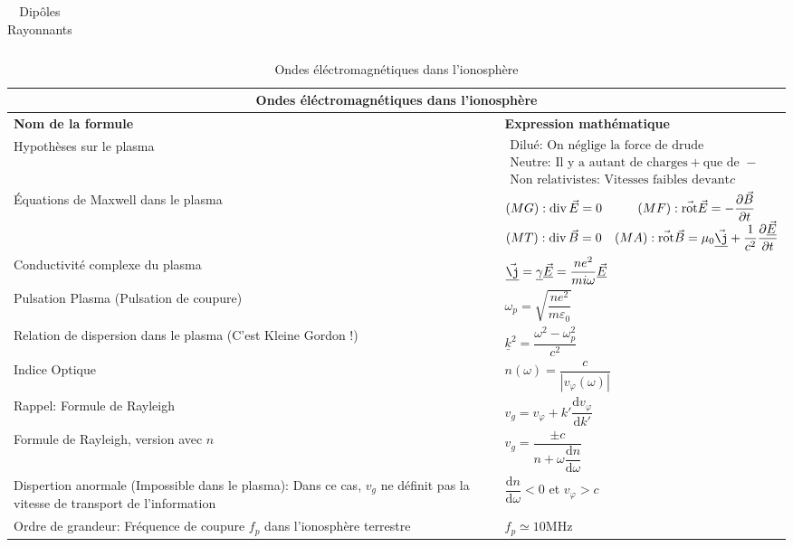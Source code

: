 \documentclass[10pt,a4paper,titlepage,portrait]{article}
\renewcommand{\d}
{
    \mathrm{d}
}
\newcommand*{\dv}[2]
{
    \dfrac{\d#1}{\d#2}
}
\newcommand*{\dpv}[2]
{
    \dfrac{\partial#1}{\partial#2}
}
\newcommand{\rot}
{
    \vec{\operatorname{rot}}
}
\renewcommand{\div}
{
    \operatorname{div}
}
\renewcommand{\arraystretch}{2}
\begin{document}
\begin{center}
\begin{table}[H]
\begin{tabular}{@{}p{9cm}p{10cm}@{}}
    \bottomrule
\end{tabular}
\caption{Dipôles Rayonnants}
\label{tab:der}
\end{table}

\begin{table}[H]
    \centering
    \renewcommand{\arraystretch}{1.5} %
    \setlength{\tabcolsep}{8pt} %
    \begin{tabular}{@{}p{9cm}p{10cm}@{}}
        \toprule
        \multicolumn{2}{c}{\textbf{Ondes éléctromagnétiques dans l'ionosphère}} \\
        \midrule
        \textbf{Nom de la formule} & \textbf{Expression mathématique} \\
        \midrule
        Hypothèses sur le plasma & $\begin{array}{l}\text{Dilué: On néglige la force de drude} \\ \text{Neutre: Il y a autant de charges} + \text{que de } - \\ \text{Non relativistes: Vitesses faibles devant} c\end{array}$ \\
        Équations de Maxwell dans le plasma & $\begin{matrix}(MG): \div \vec{E} = 0 & (MF): \rot\vec{E} = -\dpv{\vec{B}}{t} \\ (MT): \div \vec{B} = 0 & (MA): \rot \vec{B} = \mu_0 \underline {\vec \j} + \dfrac{1}{c^2}\dpv{\underline {\vec E}}{t}\end{matrix}$ \\
        Conductivité complexe du plasma & $\underline {\vec \j} = \underline \gamma \underline {\vec E}  = \dfrac{ne^2}{mi\omega} \underline {\vec E}$ \\
        Pulsation Plasma (Pulsation de coupure) & $\omega_p = \sqrt{\dfrac{ne^2}{m\varepsilon_0}}$ \\
        Relation de dispersion dans le plasma (C'est Kleine Gordon !)& $\underline k ^2 = \dfrac{\omega^2 - \omega_p^2}{c^2}$ \\
        Indice Optique & $n(\omega) = \dfrac{c}{|v_{\varphi}(\omega)|}$ \\
        Rappel: Formule de Rayleigh & $v_g = v_{\varphi} + k'\dv{v_{\varphi}}{k'}$ \\
        Formule de Rayleigh, version avec $n$ & $v_g = \dfrac{\pm c}{n+\omega\dv{n}{\omega}}$ \\ 
        Dispertion anormale (Impossible dans le plasma): Dans ce cas, $v_g$ ne définit pas la vitesse de transport de l'information & $\dv{n}{\omega} < 0$ et $v_{\varphi} > c$\\
        Ordre de grandeur: Fréquence de coupure $f_p$ dans l'ionosphère terrestre & $f_p \simeq \num{10}\unit{\MHz}$ \\
    \bottomrule
\end{tabular}
\caption{Ondes éléctromagnétiques dans l'ionosphère}
\label{tab:ohm_iono}
\end{table}



\end{center}
\end{document}
